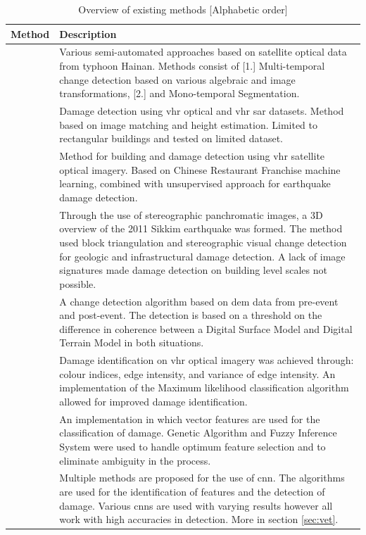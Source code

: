 \begin{table} [!h]
	\centering
	\captionsetup{justification=raggedright,singlelinecheck=false}
	\caption{\footnotesize{Overview of existing methods [Alphabetic order]}}
	\begin{footnotesize}
		\begin{tabular}{p{3cm}p{8cm}}
			\toprule
			Method & Description \\
			\midrule
			\citep{Antonietta2015} & Various semi-automated approaches based on satellite optical data from typhoon Hainan. Methods consist of [1.] Multi-temporal change detection based on various algebraic and image transformations, [2.] and Mono-temporal Segmentation. \\
			\citep{Brunner2010} & Damage detection using \ac{vhr} optical and \ac{vhr} \ac{sar} datasets. Method based on image matching and height estimation. Limited to rectangular buildings and tested on limited dataset.\\
			\citep{Li2017} & Method for building and damage detection using \ac{vhr} satellite optical imagery. Based on Chinese Restaurant Franchise machine learning, combined with unsupervised approach for earthquake damage detection.\\
			\citep{Martha2015} & Through the use of stereographic panchromatic images, a 3D overview of the 2011 Sikkim earthquake was formed. The method used block triangulation and stereographic visual change detection for geologic and infrastructural damage detection.  A lack of image signatures made damage detection on building level scales not possible.\\
			\citep{Menderes2015} & A change detection algorithm based on \ac{dem} data from pre-event and post-event. The detection is based on a threshold on the difference in coherence between a Digital Surface Model and Digital Terrain Model in both situations.\\
			\citep{Ozisik2004} & Damage identification on \ac{vhr} optical imagery was achieved through: colour indices, edge intensity, and variance of edge intensity.  An implementation of the Maximum likelihood classification algorithm allowed for improved damage identification.  \\
			\citep{Samadzadegan2005} & An implementation in which vector features are used for the classification of damage. Genetic Algorithm and Fuzzy Inference System were used to handle optimum feature selection and to eliminate ambiguity in the process. \\
			\citep{Vetrivel2016b} & Multiple methods are proposed for the use of \ac{cnn}. The algorithms are used for the identification of features and the detection of damage. Various \ac{cnn}s are used with varying results however all work with high accuracies in detection. More in section \ref{sec:vet}.\\

\end{tabular}
\end{footnotesize}
\end{table}
